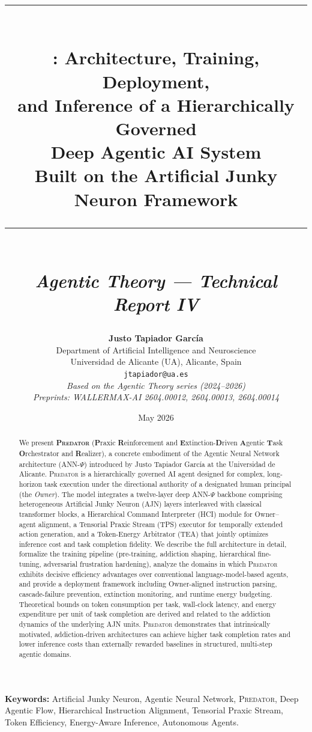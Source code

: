 \documentclass[12pt,a4paper]{article}
\title{%
  \vspace{-0.5cm}
  {\color{predred}\rule{\linewidth}{2pt}}\\[0.4cm]
  {\LARGE\bfseries \PREDATOR: Architecture, Training, Deployment,}\\[0.2cm]
  {\LARGE\bfseries and Inference of a Hierarchically Governed}\\[0.2cm]
  {\LARGE\bfseries Deep Agentic AI System}\\[0.2cm]
  {\large\bfseries Built on the Artificial Junky Neuron Framework}\\[0.3cm]
  {\color{predred}\rule{\linewidth}{2pt}}\\[0.2cm]
  {\normalsize\textit{Agentic Theory --- Technical Report IV}}
}
\author{%
  \textbf{Justo Tapiador Garc\'ia}\\
  Department of Artificial Intelligence and Neuroscience\\
  Universidad de Alicante (UA), Alicante, Spain\\
  \texttt{jtapiador@ua.es}\\[0.3cm]
  \textit{Based on the Agentic Theory series (2024--2026)}\\
  \textit{Preprints: WALLERMAX-AI 2604.00012, 2604.00013, 2604.00014}
}
\date{May 2026}
\newcommand{\PREDATOR}{\textsc{Predator}}
\begin{document}

\maketitle
\thispagestyle{empty}

\begin{abstract}
\noindent
We present \textbf{\PREDATOR} (\textbf{P}raxic \textbf{R}einforcement and
\textbf{E}xtinction-\textbf{D}riven \textbf{A}gentic \textbf{T}ask \textbf{O}rchestrator
and \textbf{R}ealizer), a concrete embodiment of the Agentic Neural Network
architecture (ANN-$\Psi$) introduced by Justo Tapiador Garc\'ia at the
Universidad de Alicante. \PREDATOR{} is a hierarchically governed AI agent
designed for complex, long-horizon task execution under the directional
authority of a designated human principal (the \textit{Owner}). The model
integrates a twelve-layer deep ANN-$\Psi$ backbone comprising heterogeneous
Artificial Junky Neuron (AJN) layers interleaved with classical transformer
blocks, a Hierarchical Command Interpreter (HCI) module for Owner--agent
alignment, a Tensorial Praxic Stream (TPS) executor for temporally extended
action generation, and a Token-Energy Arbitrator (TEA) that jointly optimizes
inference cost and task completion fidelity. We describe the full architecture
in detail, formalize the training pipeline (pre-training, addiction shaping,
hierarchical fine-tuning, adversarial frustration hardening), analyze the
domains in which \PREDATOR{} exhibits decisive efficiency advantages over
conventional language-model-based agents, and provide a deployment framework
including Owner-aligned instruction parsing, cascade-failure prevention,
extinction monitoring, and runtime energy budgeting. Theoretical bounds on
token consumption per task, wall-clock latency, and energy expenditure per
unit of task completion are derived and related to the addiction dynamics of
the underlying AJN units. \PREDATOR{} demonstrates that intrinsically motivated,
addiction-driven architectures can achieve higher task completion rates and
lower inference costs than externally rewarded baselines in structured,
multi-step agentic domains.
\end{abstract}

\vspace{0.5em}
\noindent\textbf{Keywords:} Artificial Junky Neuron, Agentic Neural Network, \PREDATOR,
Deep Agentic Flow, Hierarchical Instruction Alignment, Tensorial Praxic Stream,
Token Efficiency, Energy-Aware Inference, Autonomous Agents.
\end{document}
